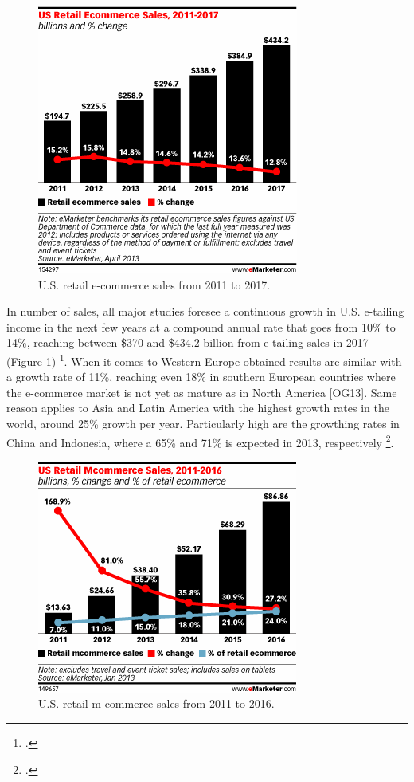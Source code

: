 \begin{figure}
\center
\includegraphics[keepaspectratio]{images/us-ecommerce-retail-from-2011-17.png}
\caption{U.S. retail e-commerce sales from 2011 to 2017.}
\label{us-ecommerce-retail-from-11-17}
\end{figure}

In number of sales, all major studies foresee a continuous growth in U.S. e-tailing income in the next few years at a compound annual rate that goes from 10\% to 14\%, reaching between \$370 and \$434.2 billion from e-tailing sales in 2017 (Figure \ref{us-ecommerce-retail-from-11-17}) \footcite{eMa413}. When it comes to
Western Europe obtained results are similar with a growth rate of 11\%, reaching even 18\% in southern European countries where the e-commerce market is not yet as mature as in North America [OG13]. Same reason applies to Asia and Latin America with the highest growth rates in the world, around 25\% growth per year. Particularly high are the growthing rates in China and Indonesia, where a 65\% and 71\% is expected in 2013, respectively \footcite{eMa613}.


\begin{figure}
\center
\includegraphics[keepaspectratio]{images/us-ecommerce-retail-from-2011-16.png}
\caption{U.S. retail m-commerce sales from 2011 to 2016.}
\label{us-ecommerce-retail-from-11-16}
\end{figure}


